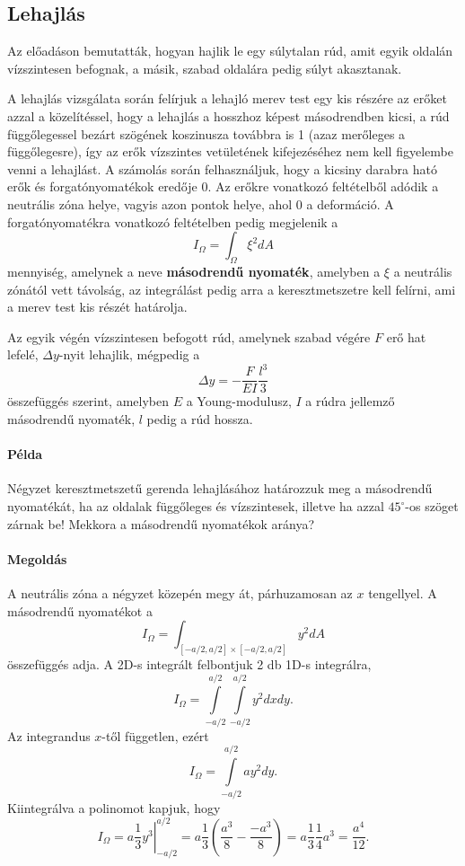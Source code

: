 \documentclass[12pt,a4paper]{scrartcl}
\begin{document}
\subsection{Lehajlás}
Az előadáson bemutatták, hogyan hajlik le egy súlytalan rúd, amit egyik oldalán vízszintesen befognak, a másik, szabad oldalára pedig súlyt akasztanak.

A lehajlás vizsgálata során felírjuk a lehajló merev test egy kis részére az erőket azzal a közelítéssel, hogy a lehajlás a hosszhoz képest másodrendben kicsi, a rúd függőlegessel bezárt szögének koszinusza továbbra is 1 (azaz merőleges a függőlegesre), így az erők vízszintes vetületének kifejezéséhez nem kell figyelembe venni a lehajlást. A számolás során felhasználjuk, hogy a kicsiny darabra ható erők és forgatónyomatékok eredője 0. Az erőkre vonatkozó feltételből adódik a neutrális zóna helye, vagyis azon pontok helye, ahol 0 a deformáció. A forgatónyomatékra vonatkozó feltételben pedig megjelenik a 
\begin{equation} \label{eq:masodrendu_nyomatek}
{I_\Omega } = \int_\Omega  {{\xi ^2}dA}
\end{equation}
mennyiség, amelynek a neve \textbf{másodrendű nyomaték}, amelyben a $\xi$ a neutrális zónától vett távolság, az integrálást pedig arra a keresztmetszetre kell felírni, ami a merev test kis részét határolja.

Az egyik végén vízszintesen befogott rúd, amelynek szabad végére $F$ erő hat lefelé, $\Delta y$-nyit lehajlik, mégpedig a
\[\Delta y =  - \frac{F}{{EI}}\frac{{{l^3}}}{3}\]
összefüggés szerint, amelyben $E$ a Young-modulusz, $I$ a rúdra jellemző másodrendű nyomaték, $l$ pedig a rúd hossza.

\footnotesize
\paragraph{Példa}
Négyzet keresztmetszetű gerenda lehajlásához határozzuk meg a másodrendű nyomatékát, ha az oldalak függőleges és vízszintesek, illetve ha azzal $45^\circ$-os szöget zárnak be! Mekkora a másodrendű nyomatékok aránya?
\paragraph{Megoldás}
A neutrális zóna a négyzet közepén megy át, párhuzamosan az $x$ tengellyel. A másodrendű nyomatékot a
\[{I_\Omega } = \int_{\left[ { - a/2,a/2} \right] \times \left[ { - a/2,a/2} \right]} {{y^2}dA} \]
összefüggés adja. A 2D-s integrált felbontjuk 2 db 1D-s integrálra,
\[{I_\Omega } = \int\limits_{ - a/2}^{a/2} {\int\limits_{ - a/2}^{a/2} {{y^2}dx} dy} .\]
Az integrandus $x$-től független, ezért
\[{I_\Omega } = \int\limits_{ - a/2}^{a/2} {a{y^2}dy} .\]
Kiintegrálva a polinomot kapjuk, hogy 
\[{I_\Omega } = a\left. {\frac{1}{3}{y^3}} \right|_{ - a/2}^{a/2} = a\frac{1}{3}\left( {\frac{{{a^3}}}{8} - \frac{{ - {a^3}}}{8}} \right) = a\frac{1}{3}\frac{1}{4}{a^3} = \frac{{{a^4}}}{{12}}.\]
\end{document}
